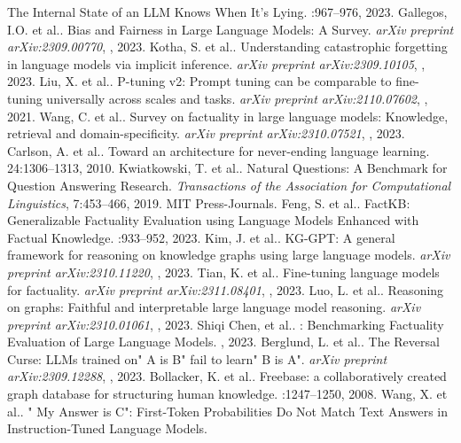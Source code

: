 \begin{thebibliography}{10}
\begin{small}
\newblock The Internal State of an LLM Knows When It’s Lying. 
:967--976, 2023.
 Gallegos, I.O. et al.. 
\newblock Bias and Fairness in Large Language Models: A Survey. 
\newblock \emph{arXiv preprint arXiv:2309.00770}, , 2023.
 Kotha, S. et al.. 
\newblock Understanding catastrophic forgetting in language models via implicit inference. 
\newblock \emph{arXiv preprint arXiv:2309.10105}, , 2023.
 Liu, X. et al.. 
\newblock P-tuning v2: Prompt tuning can be comparable to fine-tuning universally across scales and tasks. 
\newblock \emph{arXiv preprint arXiv:2110.07602}, , 2021.
 Wang, C. et al.. 
\newblock Survey on factuality in large language models: Knowledge, retrieval and domain-specificity. 
\newblock \emph{arXiv preprint arXiv:2310.07521}, , 2023.
 Carlson, A. et al.. 
\newblock Toward an architecture for never-ending language learning. 
24:1306--1313, 2010.
 Kwiatkowski, T. et al.. 
\newblock Natural Questions: A Benchmark for Question Answering Research. 
\newblock \emph{Transactions of the Association for Computational Linguistics}, 7:453--466, 2019. MIT Press-Journals.
 Feng, S. et al.. 
\newblock FactKB: Generalizable Factuality Evaluation using Language Models Enhanced with Factual Knowledge. 
:933--952, 2023.
 Kim, J. et al.. 
\newblock KG-GPT: A general framework for reasoning on knowledge graphs using large language models. 
\newblock \emph{arXiv preprint arXiv:2310.11220}, , 2023.
 Tian, K. et al.. 
\newblock Fine-tuning language models for factuality. 
\newblock \emph{arXiv preprint arXiv:2311.08401}, , 2023.
 Luo, L. et al.. 
\newblock Reasoning on graphs: Faithful and interpretable large language model reasoning. 
\newblock \emph{arXiv preprint arXiv:2310.01061}, , 2023.
 Shiqi Chen,  et al.. 
: Benchmarking Factuality Evaluation of Large Language Models. 
, 2023.
 Berglund, L. et al.. 
\newblock The Reversal Curse: LLMs trained on" A is B" fail to learn" B is A". 
\newblock \emph{arXiv preprint arXiv:2309.12288}, , 2023.
 Bollacker, K. et al.. 
\newblock Freebase: a collaboratively created graph database for structuring human knowledge. 
:1247--1250, 2008.
 Wang, X. et al.. 
\newblock " My Answer is C": First-Token Probabilities Do Not Match Text Answers in Instruction-Tuned Language Models. 

\end{small}
\end{thebibliography}
